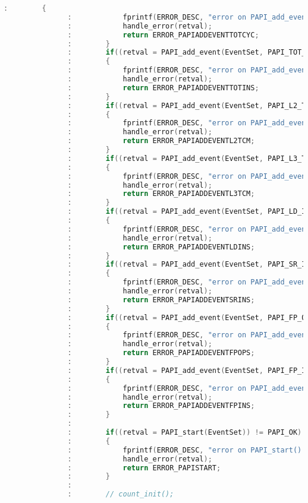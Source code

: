 \begin{lstlisting}[language=C,breaklines=true]
               :		{
               :			fprintf(ERROR_DESC, "error on PAPI_add_event(PAPI_TOT_CYC): ");	
               :			handle_error(retval);				
               :			return ERROR_PAPIADDEVENTTOTCYC;
               :		}
               :		if((retval = PAPI_add_event(EventSet, PAPI_TOT_INS)) != PAPI_OK)
               :		{
               :			fprintf(ERROR_DESC, "error on PAPI_add_event(PAPI_TOT_INS): ");
               :			handle_error(retval);	
               :			return ERROR_PAPIADDEVENTTOTINS;
               :		}
               :		if((retval = PAPI_add_event(EventSet, PAPI_L2_TCM)) != PAPI_OK)
               :		{
               :			fprintf(ERROR_DESC, "error on PAPI_add_event(PAPI_L2_TCM): ");
               :			handle_error(retval);		
               :			return ERROR_PAPIADDEVENTL2TCM;
               :		}
               :		if((retval = PAPI_add_event(EventSet, PAPI_L3_TCM)) != PAPI_OK)
               :		{
               :			fprintf(ERROR_DESC, "error on PAPI_add_event(PAPI_L3_TCM): ");
               :			handle_error(retval);	
               :			return ERROR_PAPIADDEVENTL3TCM;
               :		}
               :		if((retval = PAPI_add_event(EventSet, PAPI_LD_INS)) != PAPI_OK)
               :		{
               :			fprintf(ERROR_DESC, "error on PAPI_add_event(PAPI_LD_INS): ");
               :			handle_error(retval);	
               :			return ERROR_PAPIADDEVENTLDINS;
               :		}
               :		if((retval = PAPI_add_event(EventSet, PAPI_SR_INS)) != PAPI_OK)
               :		{
               :			fprintf(ERROR_DESC, "error on PAPI_add_event(PAPI_SR_INS)");
               :			handle_error(retval);	
               :			return ERROR_PAPIADDEVENTSRINS;
               :		}
               :		if((retval = PAPI_add_event(EventSet, PAPI_FP_OPS)) != PAPI_OK)
               :		{
               :			fprintf(ERROR_DESC, "error on PAPI_add_event(PAPI_FP_OPS): ");
               :			handle_error(retval);	
               :			return ERROR_PAPIADDEVENTFPOPS;
               :		}	
               :		if((retval = PAPI_add_event(EventSet, PAPI_FP_INS)) != PAPI_OK)
               :		{
               :			fprintf(ERROR_DESC, "error on PAPI_add_event(PAPI_FP_INS): ");
               :			handle_error(retval);	
               :			return ERROR_PAPIADDEVENTFPINS;	
               :		}
               :	
               :		if((retval = PAPI_start(EventSet)) != PAPI_OK)
               :		{
               :			fprintf(ERROR_DESC, "error on PAPI_start(): ");
               :			handle_error(retval);	
               :			return ERROR_PAPISTART;
               :		}
               :	
               :		// count_init();

\end{lstlisting}
